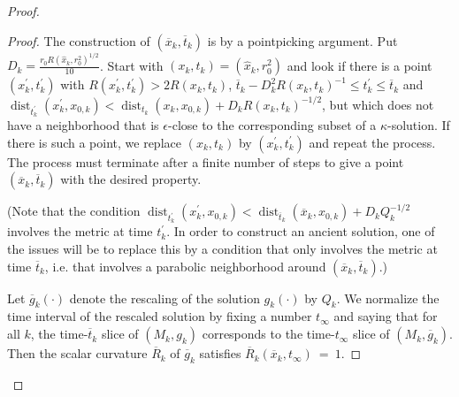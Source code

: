 \documentclass[12pt]{amsart}
\newcommand{\dist}{\operatorname{dist}}
\numberwithin{equation}{section}
\theoremstyle{plain}
\theoremstyle{definition}
\theoremstyle{remark}
\begin{document}
\begin{proof}
\begin{proof}
The construction of $(\overline{x}_k, \overline{t}_k)$ is by a pointpicking
argument.
Put $D_k = \frac{r_0 R(\hat{x}_k, r_0^2)^{1/2}}{10}$.
Start with $(x_k, t_k) = (\hat{x}_k, r_0^2)$
and look if there is a point
$(x^\prime_k, t^\prime_k)$ with $R(x^\prime_k, t^\prime_k) > 2
R(x_k, t_k)$, 
$\overline{t}_k - D_k^2 R(x_k, t_k)^{-1} \le
t^\prime_k \le \overline{t}_k$ and 
$\dist_{t^\prime_k}(x^\prime_k, {x}_{0,k}) 
< \dist_{{t}_k}({x}_k, 
x_{0,k}) +
D_k R(x_k, t_k)^{-1/2}$, but 
which does not have a neighborhood that is
$\epsilon$-close to the corresponding subset of a $\kappa$-solution.
If there is such a point, we replace $(x_k, t_k)$ by $(x^\prime_k, 
t^\prime_k)$ and repeat the process.  The process must terminate after
a finite number of steps to give a point
$(\overline{x}_k, \overline{t}_k)$ with the desired property.

(Note that the condition
$\dist_{t^\prime_k}(x^\prime_k, {x}_{0,k}) 
< \dist_{\overline{t}_k}(\overline{x}_k, 
x_{0,k}) +
D_k Q_k^{-1/2}$ involves the metric at time $t^\prime_k$. In order
to construct an ancient solution, one of the issues will be to
replace this by a condition that only involves the metric at time
$\overline{t}_k$, i.e. that involves a parabolic neighborhood
around $(\overline{x}_k, \overline{t}_k)$.)

Let $\overline{g}_k(\cdot)$ denote
the rescaling of the solution $g_k(\cdot)$ by $Q_k$. We
normalize the time interval of the rescaled solution
by fixing a number ${t}_\infty$
and saying that for all $k$,
the time-$\overline{t}_k$ slice of $(M_k, g_k)$ corresponds to the
time-${t}_\infty$ slice of $(M_k, \overline{g}_k)$.
Then the scalar
curvature $\overline{R}_k$ of $\overline{g}_k$ satisfies 
$\overline{R}_k(\overline{x}_k, {t}_\infty) \: = \: 1$.


\end{proof}
\end{proof}
\end{document}
